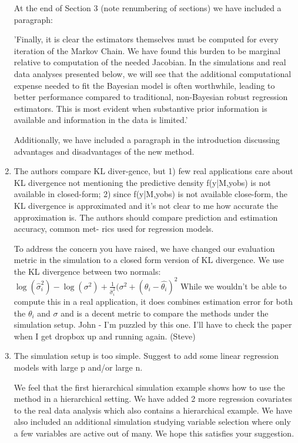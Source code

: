 \documentclass{article}
\newcommand{\response}[1]{{\color{blue}#1}}
\begin{document}
\begin{enumerate}
\response{At the end of Section 3 (note renumbering of sections) we have included a paragraph:}

\response{'Finally, it is clear the estimators themselves must be computed for every iteration of the Markov Chain. We have found this burden to be marginal relative to computation of the needed Jacobian. In the simulations and real data analyses presented below, we will see that the additional computational expense needed to fit the Bayesian model is often worthwhile, leading to better performance compared to traditional, non-Bayesian robust regression estimators.  This is most evident when substantive prior information is available and information in the data is limited.'}

\response{Additionally, we have included a paragraph in the introduction discussing advantages and disadvantages of the new method.}

\item The authors compare KL diver-gence, but 1) few real applications care about KL divergence not mentioning the predictive density f(y|M,yobs) is not available in closed-form; 2) since f(y|M,yobs) is not available close-form, the KL divergence is approximated and it's not clear to me how accurate the approximation is.
The authors should compare prediction and estimation accuracy, common met- rics used for regression models.

\response{To address the concern you have raised, we have changed our evaluation metric in the simulation to a closed form version of KL divergence.  We use the KL divergence between two normals: $ 
\log(\hat\sigma_{i}^{2}) - \log(\sigma^{2}) + \frac{1}{\hat\sigma_{i}^{2}}(\sigma^{2} + (\theta_{i} - \hat{\theta_{i}})^{2}
$
While we wouldn't be able to compute this in a real application, it does combines estimation error for both the $\theta_{i}$ and $\sigma$ and is a decent metric to compare the methods under the simulation setup. }
John - I'm puzzled by this one.  I'll have to check the paper when I get dropbox up and running again.  (Steve)

\item The simulation setup is too simple. Suggest to add some linear regression models with large p and/or large n.

\response{We feel that the first hierarchical simulation example shows how to use the method in a hierarchical setting. We have added 2 more regression covariates to the real data analysis which also contains a hierarchical example. We have also included an additional simulation studying variable selection where only a few variables are active out of many.  We hope this satisfies your suggestion.}

\end{enumerate}
\end{document}
